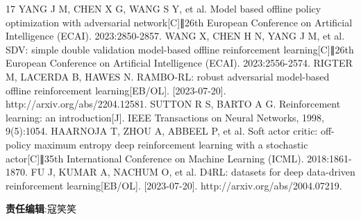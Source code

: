 \documentclass{article}
\begin{document}
\begin{thebibliography}{17}
   YANG J M, CHEN X G, WANG S Y, et al. Model based offline policy optimization with adversarial network[C]∥26th European Conference on Artificial Intelligence (ECAI). 2023:2850-2857.
   WANG X, CHEN H N, YANG J M, et al. SDV: simple double validation model-based offline reinforcement learning[C]∥26th European Conference on Artificial Intelligence (ECAI). 2023:2556-2574.
   RIGTER M, LACERDA B, HAWES N. RAMBO-RL: robust adversarial model-based offline reinforcement learning[EB/OL]. [2023-07-20]. http://arxiv.org/abs/2204.12581.
   SUTTON R S, BARTO A G. Reinforcement learning: an introduction[J]. IEEE Transactions on Neural Networks, 1998, 9(5):1054.
   HAARNOJA T, ZHOU A, ABBEEL P, et al. Soft actor critic: off-policy maximum entropy deep reinforcement learning with a stochastic actor[C]∥35th International Conference on Machine Learning (ICML). 2018:1861-1870.
   FU J, KUMAR A, NACHUM O, et al. D4RL: datasets for deep data-driven reinforcement learning[EB/OL]. [2023-07-20]. http://arxiv.org/abs/2004.07219.
\end{thebibliography}

\noindent \textbf{责任编辑}:寇笑笑
\end{document}
